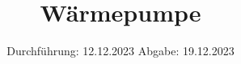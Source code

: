 

\subject{V206}
\title{Wärmepumpe}
\date{%
  Durchführung: 12.12.2023
  \hspace{3em}
  Abgabe: 19.12.2023
}



\maketitle
\thispagestyle{empty}
\tableofcontents
\newpage







\printbibliography{}


